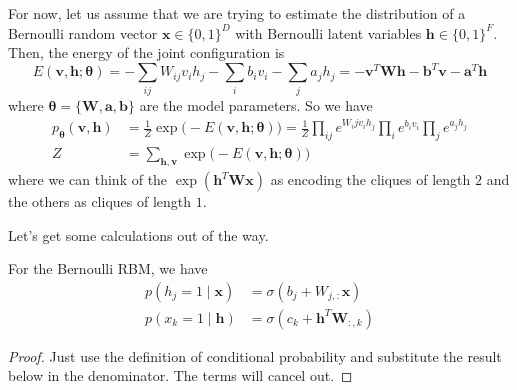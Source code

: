 \documentclass{article}
\begin{document}
      \begin{definition}
        For now, let us assume that we are trying to estimate the distribution of a Bernoulli random vector $\mathbf{x} \in \{0, 1\}^D$ with Bernoulli latent variables $\mathbf{h} \in \{0, 1\}^F$. Then, the energy of the joint configuration is  
          \[E(\mathbf{v}, \mathbf{h}; \boldsymbol{\theta}) = - \sum_{ij} W_{ij} v_i h_j - \sum_i b_i v_i - \sum_j a_j h_j = - \mathbf{v}^T \mathbf{W} \mathbf{h} - \mathbf{b}^T \mathbf{v} - \mathbf{a}^T \mathbf{h}\]
        where $\boldsymbol{\theta} = \{\mathbf{W}, \mathbf{a}, \mathbf{b}\}$ are the model parameters. So we have 
          \begin{align*} 
            p_{\boldsymbol{\theta}} (\mathbf{v}, \mathbf{h}) & = \frac{1}{Z} \exp \big( -E (\mathbf{v}, \mathbf{h}; \boldsymbol{\theta})\big) = \frac{1}{Z} \prod_{ij} e^{W_ij v_i h_j} \prod_i e^{b_i v_i} \prod_j e^{a_j h_j} \\
            Z & = \sum_{\mathbf{h}, \mathbf{v}} \exp \big( -E(\mathbf{v}, \mathbf{h}; \boldsymbol{\theta}) \big) 
          \end{align*}
        where we can think of the $\exp(\mathbf{h}^T \mathbf{W} \mathbf{x})$ as encoding the cliques of length $2$ and the others as cliques of length $1$.  
      \end{definition}

      Let's get some calculations out of the way. 

      \begin{lemma} 
        For the Bernoulli RBM, we have 
        \begin{align*} 
          p(h_j = 1 \mid \mathbf{x}) & = \sigma ( b_j + W_{j,:} \mathbf{x}) \\
          p(x_k = 1 \mid \mathbf{h}) & = \sigma ( c_k + \mathbf{h}^T \mathbf{W}_{:, k})
        \end{align*}
      \end{lemma}
      \begin{proof}
        Just use the definition of conditional probability and substitute the result below in the denominator. The terms will cancel out. 
      \end{proof}
\end{document}
